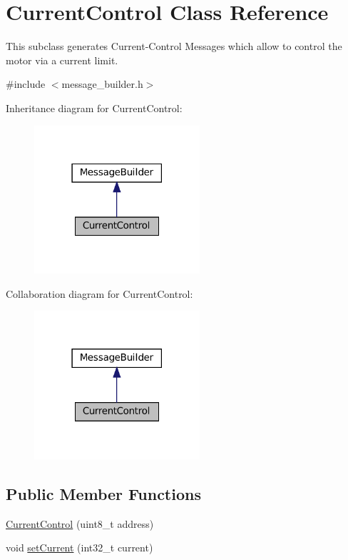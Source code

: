 \hypertarget{classCurrentControl}{}\section{Current\+Control Class Reference}
\label{classCurrentControl}


This subclass generates Current-\/\+Control Messages which allow to control the motor via a current limit.  




{\ttfamily \#include $<$message\+\_\+builder.\+h$>$}



Inheritance diagram for Current\+Control\+:
\nopagebreak
\begin{figure}[H]
\begin{center}
\leavevmode
\includegraphics[width=174pt]{classCurrentControl__inherit__graph}
\end{center}
\end{figure}


Collaboration diagram for Current\+Control\+:
\nopagebreak
\begin{figure}[H]
\begin{center}
\leavevmode
\includegraphics[width=174pt]{classCurrentControl__coll__graph}
\end{center}
\end{figure}
\subsection*{Public Member Functions}
\begin{DoxyCompactItemize}
\item 
\hyperlink{classCurrentControl_a3e56845d95613d4c55d7b8dde7cc8300}{Current\+Control} (uint8\+\_\+t address)
\item 
void \hyperlink{classCurrentControl_a5096783dd03da0895cd352fc9977736d}{set\+Current} (int32\+\_\+t current)
\end{DoxyCompactItemize}
